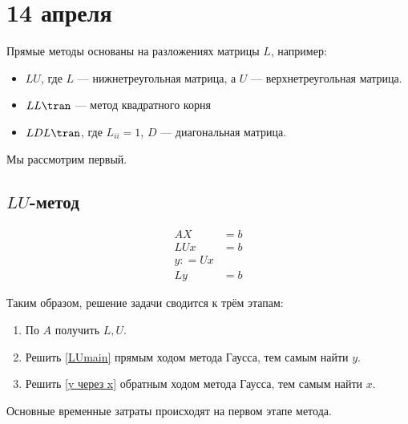 \chapter{14 апреля}

Прямые методы основаны на разложениях матрицы \(L\), например:
\begin{itemize}
    \item \(LU\), где \(L\) --- нижнетреугольная матрица, а \(U\) --- верхнетреугольная матрица.
    \item \(LL\tran \) --- метод квадратного корня
    \item \(LDL\tran \), где \(L_{ii} = 1\), \(D\) --- диагональная матрица.
\end{itemize}

Мы рассмотрим первый.

\section{\(LU\)-метод}

\begin{align}
    A X & = b                    \\
    LUx & = b                    \\
    y : = Ux   \label{y через x} \\
    Ly  & = b \label{LUmain}
\end{align}

Таким образом, решение задачи сводится к трём этапам:
\begin{enumerate}
    \item По \(A\) получить \(L, U\).
    \item Решить \eqref{LUmain} прямым ходом метода Гаусса, тем самым найти \(y\).
    \item Решить \eqref{y через x} обратным ходом метода Гаусса, тем самым найти \(x\).
\end{enumerate}

Основные временные затраты происходят на первом этапе метода.


